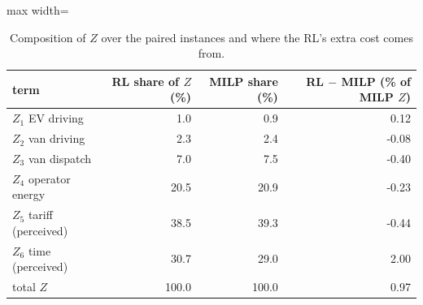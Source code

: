 \begin{table}[H]\centering
\caption{Composition of $Z$ over the paired instances and where the RL's extra cost comes from.}\label{tab:terms}
\begin{adjustbox}{max width=\textwidth}\begin{tabular}{lrrr}\toprule
term & RL share of $Z$ (\%) & MILP share (\%) & RL $-$ MILP (\% of MILP $Z$) \\ \midrule
$Z_1$ EV driving & 1.0 & 0.9 & 0.12 \\
$Z_2$ van driving & 2.3 & 2.4 & -0.08 \\
$Z_3$ van dispatch & 7.0 & 7.5 & -0.40 \\
$Z_4$ operator energy & 20.5 & 20.9 & -0.23 \\
$Z_5$ tariff (perceived) & 38.5 & 39.3 & -0.44 \\
$Z_6$ time (perceived) & 30.7 & 29.0 & 2.00 \\
total $Z$ & 100.0 & 100.0 & 0.97 \\
\bottomrule\end{tabular}\end{adjustbox}\end{table}
